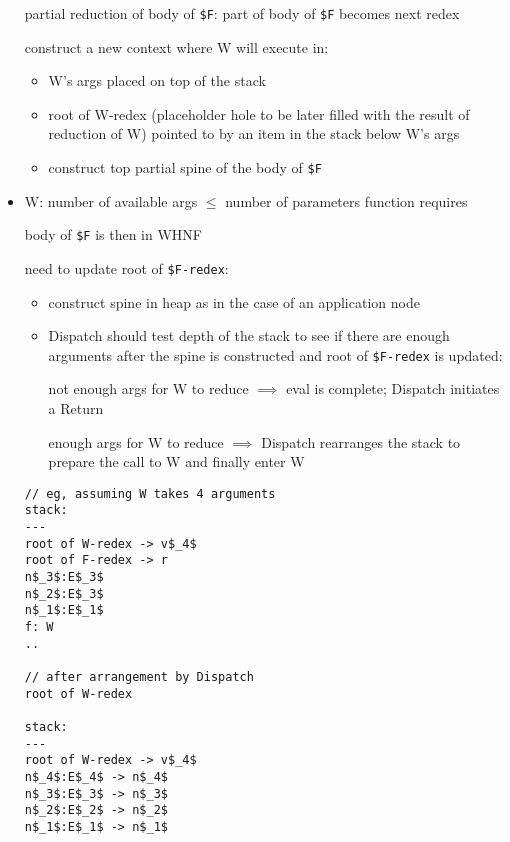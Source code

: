 \documentclass[8pt]{extarticle}
\begin{document}
\begin{multicols*}{2}
\begin{itemize}
  partial reduction of body of \verb|$F|: part of body of \verb|$F| becomes next redex

  construct a new context where W will execute in:
  \begin{itemize}
  \item W's args placed on top of the stack
  \item root of W-redex (placeholder hole to be later filled with the result of reduction of W) pointed to by an item in the stack below W's args
  \item construct top partial spine of the body of \verb|$F|
  \end{itemize}

\item W: number of available args $\leq$ number of parameters function requires

  body of \verb|$F| is then in WHNF

  need to update root of \verb|$F-redex|:

  \begin{itemize}

    \item construct spine in heap as in the case of an application node

    \item Dispatch should test depth of the stack to see if there are enough arguments after the spine is constructed and root of \verb|$F-redex| is updated:

      not enough args for W to reduce $\implies$  eval is complete; Dispatch initiates a Return

      enough args for W to reduce $\implies$ Dispatch rearranges the stack to prepare the call to W and finally enter W
    \end{itemize}

    \begin{lstlisting}
// eg, assuming W takes 4 arguments
stack:
---
root of W-redex -> v$_4$
root of F-redex -> r
n$_3$:E$_3$
n$_2$:E$_3$
n$_1$:E$_1$
f: W
..

// after arrangement by Dispatch
root of W-redex

stack:
---
root of W-redex -> v$_4$
n$_4$:E$_4$ -> n$_4$
n$_3$:E$_3$ -> n$_3$
n$_2$:E$_2$ -> n$_2$
n$_1$:E$_1$ -> n$_1$
    \end{lstlisting}
    

\end{itemize}
\end{multicols*}
\end{document}
